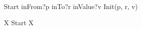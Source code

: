\documentclass{article}
\begin{document}
\begin{circusaction}
      Start \circdef inFrom?p \then inTo?r \then inValue?v \then Init(p, r, v)
\end{circusaction}

\begin{circusaction}
    \circspot \circmu X \circspot Start \circseq X
\end{circusaction}

\begin{circus}
    \circend
\end{circus}

\end{document}

